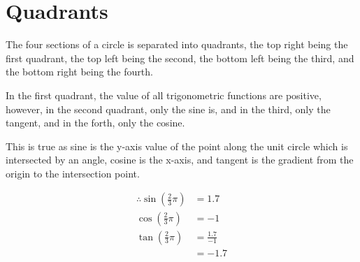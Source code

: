 \documentclass{book}
\begin{document}
\section{Quadrants}
The four sections of a circle is separated into quadrants, the top right being the first quadrant, the top left being the second, the bottom left being the third, and the bottom right being the fourth.
\begin{center}
\end{center}
In the first quadrant, the value of all trigonometric functions are positive, however, in the second quadrant, only the sine is, and in the third, only the tangent, and in the forth, only the cosine.
\begin{center}
\end{center}
This is true as sine is the y-axis value of the point along the unit circle which is intersected by an angle, cosine is the x-axis, and tangent is the gradient from the origin to the intersection point.
\begin{center}
	\begin{align*}
		\therefore \sin\left(\frac{2}{3}\pi\right) & = 1.7            \\
		\cos\left(\frac{2}{3}\pi\right)            & = -1             \\
		\tan\left(\frac{2}{3}\pi\right)            & = \frac{1.7}{-1} \\
		                                           & = -1.7
	\end{align*}
\end{center}
\end{document}
